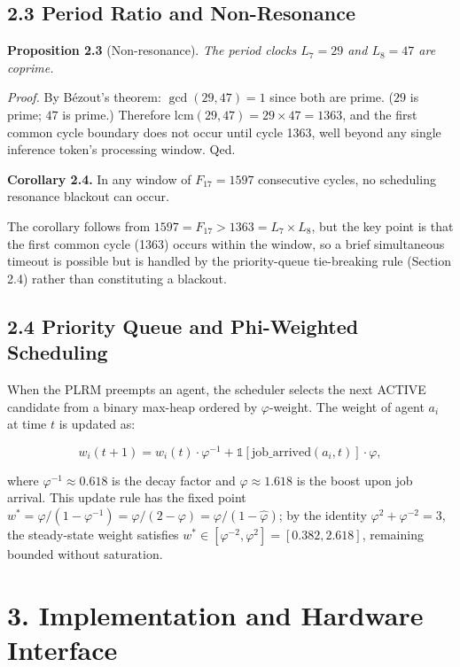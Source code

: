 \subsection{2.3 Period Ratio and
Non-Resonance}\label{fa_24:period-ratio-and-non-resonance}

\textbf{Proposition 2.3} (Non-resonance).
\emph{The period clocks \(L_7 = 29\) and
\(L_8 = 47\) are coprime.}

\emph{Proof.} By Bézout's theorem:
\(\gcd(29, 47) = 1\) since both are prime. (\(29\)
is prime; \(47\) is prime.) Therefore
\(\mathrm{lcm}(29, 47) = 29 \times 47 = 1363\),
and the first common cycle boundary does not occur
until cycle 1363, well beyond any single inference
token's processing window. Qed.

\textbf{Corollary 2.4.} In any window of
\(F_{17} = 1597\) consecutive cycles, no
scheduling resonance blackout can occur.

The corollary follows from
\(1597 = F_{17} > 1363 = L_7 \times L_8\), but the
key point is that the first common cycle (1363)
occurs within the window, so a brief simultaneous
timeout is possible but is handled by the
priority-queue tie-breaking rule (Section 2.4)
rather than constituting a blackout.

\subsection{2.4 Priority Queue and Phi-Weighted
Scheduling}\label{fa_24:priority-queue-and-phi-weighted-scheduling}

When the PLRM preempts an agent, the scheduler
selects the next ACTIVE candidate from a binary
max-heap ordered by \(\varphi\)-weight. The weight
of agent \(a_i\) at time \(t\) is updated as:

\[w_i(t+1) = w_i(t) \cdot \varphi^{-1} + \mathbb{1}[\text{job\_arrived}(a_i, t)] \cdot \varphi,\]

where \(\varphi^{-1} \approx 0.618\) is the decay
factor and \(\varphi \approx 1.618\) is the boost
upon job arrival. This update rule has the fixed
point
\(w^* = \varphi / (1 - \varphi^{-1}) = \varphi / (2 - \varphi) = \varphi / (1 - \hat\varphi)\);
by the identity \(\varphi^2 + \varphi^{-2} = 3\),
the steady-state weight satisfies
\(w^* \in [\varphi^{-2}, \varphi^2] = [0.382, 2.618]\),
remaining bounded without saturation.

\section{3. Implementation and Hardware
Interface}\label{fa_24:implementation-and-hardware-interface}

